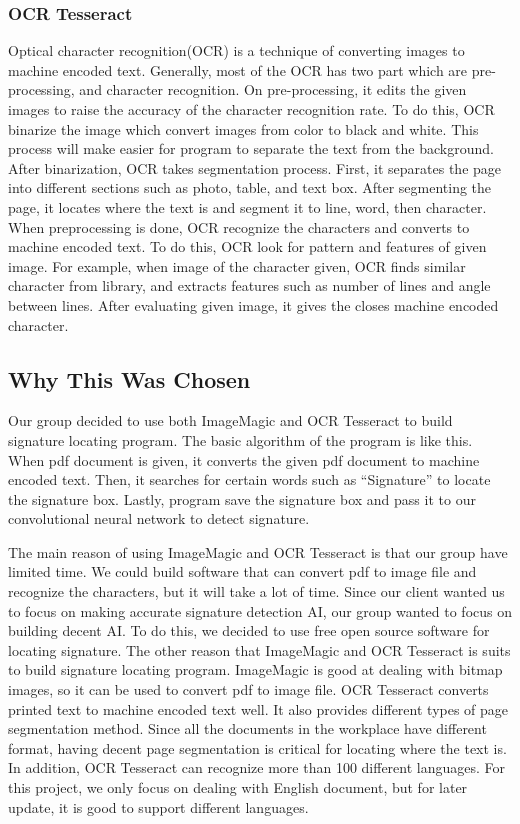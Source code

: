 \documentclass[onecolumn, draftclsnofoot,10pt, compsoc]{IEEEtran}
\begin{document}
\subsubsection{OCR Tesseract}
Optical character recognition(OCR) is a technique of converting images to machine encoded text. Generally, most of the OCR has two part which are pre-processing, and character recognition. On pre-processing, it edits the given images to raise the accuracy of the character recognition rate. To do this, OCR binarize the image which convert images from color to black and white. This process will make easier for program to separate the text from the background. After binarization, OCR takes segmentation process. First, it separates the page into different sections such as photo, table, and text box. After segmenting the page, it locates where the text is and segment it to line, word, then character. When preprocessing is done, OCR recognize the characters and converts to machine encoded text. To do this, OCR look for pattern and features of given image. For example, when image of the character given, OCR finds similar character from library, and extracts features such as number of lines and angle between lines. After evaluating given image, it gives the closes machine encoded character.

\subsection{Why This Was Chosen}
Our group decided to use both ImageMagic and OCR Tesseract to build signature locating program. The basic algorithm of the program is like this. When pdf document is given, it converts the given pdf document to machine encoded text. Then, it searches for certain words such as “Signature” to locate the signature box. Lastly, program save the signature box and pass it to our convolutional neural network to detect signature. 

The main reason of using ImageMagic and OCR Tesseract is that our group have limited time. We could build software that can convert pdf to image file and recognize the characters, but it will take a lot of time. Since our client wanted us to focus on making accurate signature detection AI, our group wanted to focus on building decent AI. To do this, we decided to use free open source software for locating signature.
The other reason that ImageMagic and OCR Tesseract is suits to build signature locating program. ImageMagic is good at dealing with bitmap images, so it can be used to convert pdf to image file. OCR Tesseract converts printed text to machine encoded text well. It also provides different types of page segmentation method. Since all the documents in the workplace have different format, having decent page segmentation is critical for locating where the text is. In addition, OCR Tesseract can recognize more than 100 different languages. For this project, we only focus on dealing with English document, but for later update, it is good to support different languages.
\end{document}
